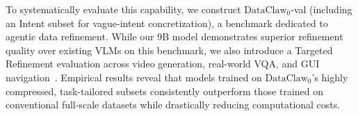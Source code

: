 To systematically evaluate this capability, we construct $\text{DataClaw}_0$-val (including an Intent subset for vague-intent concretization), a benchmark dedicated to agentic data refinement. 
While our 9B model demonstrates superior refinement quality over existing VLMs on this benchmark, we also introduce a Targeted Refinement evaluation across video generation, real-world VQA, and GUI navigation~\cite{grauman2022ego4d,remot,deng2009imagenet}. Empirical results reveal that models trained on $\text{DataClaw}_0$'s highly compressed, task-tailored subsets consistently outperform those trained on conventional full-scale datasets while drastically reducing computational costs. 



